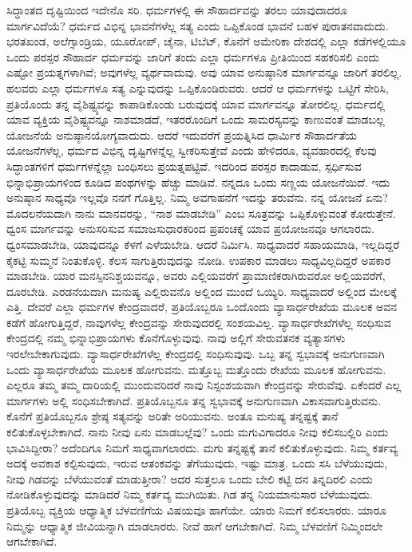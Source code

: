 ಸಿದ್ಧಾಂತದ ದೃಷ್ಟಿಯಿಂದ ಇದೇನೊ ಸರಿ. ಧರ್ಮಗಳಲ್ಲಿ ಈ ಸೌಹಾರ್ದವನ್ನು ತರಲು ಯಾವುದಾದರೂ ಮಾರ್ಗವಿದೆಯೆ? ಧರ್ಮದ ವಿಭಿನ್ನ ಭಾವನೆಗಳೆಲ್ಲ ಸತ್ಯ ಎಂದು ಒಪ್ಪಿಕೊಂಡ ಭಾವನೆ ಬಹಳ ಪುರಾತನವಾದುದು. ಭರತಖಂಡ, ಅಲೆಗ್ಸಾಂಡ್ರಿಯ, ಯೂರೋಪ್​, ಚೈನಾ, ಟಿಬೆಟ್​, ಕೊನೆಗೆ ಅಮೇರಿಕಾ ದೇಶದಲ್ಲಿ ಎಲ್ಲಾ ಕಡೆಗಳಲ್ಲಿಯೂ ಒಂದು ಪರಸ್ಪರ ಸೌಹಾರ್ದ ಧರ್ಮವನ್ನು ಜಾರಿಗೆ ತಂದು ಎಲ್ಲಾ ಧರ್ಮಗಳೂ ಪ್ರೀತಿಯಿಂದ ಸಹಕರಿಸಲಿ ಎಂದು ಎಷ್ಟೋ ಪ್ರಯತ್ನಗಳಾಗಿವೆ; ಅವುಗಳೆಲ್ಲ ವ್ಯರ್ಥವಾದುವು. ಅವು ಯಾವ ಅನುಷ್ಠಾನಿಕ ಮಾರ್ಗವನ್ನೂ ಜಾರಿಗೆ ತರಲಿಲ್ಲ. ಹಲವರು ಎಲ್ಲಾ ಧರ್ಮಗಳೂ ಸತ್ಯ ಎನ್ನುವುದನ್ನು ಒಪ್ಪಿಕೊಂಡಿರುವರು. ಆದರೆ ಆ ಧರ್ಮಗಳನ್ನು ಒಟ್ಟಿಗೆ ಸೇರಿಸಿ, ಪ್ರತಿಯೊಂದು ತನ್ನ ವೈಶಿಷ್ಟ್ಯವನ್ನು ಕಾಪಾಡಿಕೊಂಡು ಬರುವುದಕ್ಕೆ ಯಾವ ಮಾರ್ಗವನ್ನೂ ತೋರಲಿಲ್ಲ. ಧರ್ಮದಲ್ಲಿ ಯಾವ ವ್ಯಕ್ತಿಯ ವೈಶಿಷ್ಟ್ಯವನ್ನೂ ನಾಶಮಾಡದೆ, ಇತರರೊಂದಿಗೆ ಒಂದು ಸಾಮರಸ್ಯವನ್ನು ಕಾಣುವಂತೆ ಮಾಡಬಲ್ಲ ಯೋಜನೆಯೆ ಅನುಷ್ಠಾನಯೋಗ್ಯವಾದುದು. ಆದರೆ ಇದುವರೆಗೆ ಪ್ರಯತ್ನಿಸಿದ ಧಾರ್ಮಿಕ ಸೌಹಾರ್ದತೆಯ ಯೋಜನೆಗಳೆಲ್ಲ, ಧರ್ಮದ ವಿಭಿನ್ನ ದೃಷ್ಟಿಗಳನ್ನೆಲ್ಲ ಸ್ವೀಕರಿಸುತ್ತೇವೆ ಎಂದು ಹೇಳಿದರೂ, ವ್ಯವಹಾರದಲ್ಲಿ ಕೆಲವು ಸಿದ್ಧಾಂತಗಳಿಗೆ ಧರ್ಮಗಳನ್ನೆಲ್ಲಾ ಬಂಧಿಸಲು ಪ್ರಯತ್ನಪಟ್ಟಿವೆ. ಇದರಿಂದ ಪರಸ್ಪರ ಕಾದಾಡುವ, ಸ್ಪರ್ಧಿಸುವ ಭಿನ್ನಾಭಿಪ್ರಾಯಗಳಿಂದ ಕೂಡಿದ ಪಂಥಗಳನ್ನು ಹೆಚ್ಚು ಮಾಡಿವೆ. ನನ್ನದೂ ಒಂದು ಸಣ್ಣಯ ಯೋಜನೆಯಿದೆ. ಇದು ಅನುಷ್ಠಾನ ಸಾಧ್ಯವೊ ಇಲ್ಲವೊ ನನಗೆ ಗೊತ್ತಿಲ್ಲ. ನಿಮ್ಮ ಅವಗಾಹನೆಗೆ ಇದನ್ನು ತರುವೆನು. ನನ್ನ ಯೋಜನೆ ಏನು? ಮೊದಲನೆಯದಾಗಿ ನಾನು ಮಾನವರನ್ನು, “ನಾಶ ಮಾಡಬೇಡಿ” ಎಂಬ ಸೂತ್ರವನ್ನು ಒಪ್ಪಿಕೊಳ್ಳುವಂತೆ ಕೋರುತ್ತೇನೆ. ಧ್ವಂಸ ಮಾರ್ಗವನ್ನು ಅನುಸರಿಸುವ ಸಮಾಜಸುಧಾರಕರಿಂದ ಪ್ರಪಂಚಕ್ಕೆ ಯಾವ ಪ್ರಯೋಜನವೂ ಆಗಲಾರದು. ಧ್ವಂಸಮಾಡಬೇಡಿ, ಯಾವುದನ್ನೂ ಕೆಳಗೆ ಎಳೆಯಬೇಡಿ. ಆದರೆ ನಿರ್ಮಿಸಿ. ಸಾಧ್ಯವಾದರೆ ಸಹಾಯಮಾಡಿ, ಇಲ್ಲದಿದ್ದರೆ ಕೈಕಟ್ಟಿ ಸುಮ್ಮನೆ ನಿಂತುಕೊಳ್ಳಿ. ಕೆಲಸ ಸಾಗುತ್ತಿರುವುದನ್ನು ನೋಡಿ. ಉಪಕಾರ ಮಾಡಲು ಸಾಧ್ಯವಿಲ್ಲದಿದ್ದರೆ ಅಪಕಾರ ಮಾಡಬೇಡಿ. ಯಾರ ಮನಸ್ಸಿನ\break ನಿಶ್ಚಯವನ್ನೂ, ಅವರು ಎಲ್ಲಿಯವರೆಗೆ ಪ್ರಾಮಾಣಿಕರಾಗಿರುವರೋ ಅಲ್ಲಿಯವರೆಗೆ, ದೂರಬೇಡಿ. ಎರಡನೆಯದಾಗಿ ಮನುಷ್ಯ ಎಲ್ಲಿರುವನೊ ಅಲ್ಲಿಂದ ಮುಂದೆ ಒಯ್ಯಿರಿ. ಸಾಧ್ಯವಾದರೆ ಅಲ್ಲಿಂದ ಮೇಲಕ್ಕೆ ಎತ್ತಿ. ದೇವರೆ ಎಲ್ಲಾ ಧರ್ಮಗಳ ಕೇಂದ್ರವಾದರೆ, ಪ್ರತಿಯೊಬ್ಬರೂ ಒಂದೊಂದು ವ್ಯಾಸಾರ್ಧರೇಖೆಯ ಮೂಲಕ ಅವನ ಕಡೆಗೆ ಹೋಗುತ್ತಿದ್ದರೆ, ನಾವುಗಳೆಲ್ಲ ಕೇಂದ್ರವನ್ನು ಸೇರುವುದರಲ್ಲಿ ಸಂಶಯವಿಲ್ಲ. ವ್ಯಾಸಾರ್ಧರೇಖೆಗಳೆಲ್ಲ ಸಂಧಿಸುವ ಕೇಂದ್ರದಲ್ಲಿ ನಮ್ಮ ಭಿನ್ನಾಭಿಪ್ರಾಯಗಳು ಕೊನೆಗೊಳ್ಳುವುವು. ನಾವು ಅಲ್ಲಿಗೆ ಸೇರುವತನಕ ವ್ಯತ್ಯಾಸಗಳು ಇರಲೇಬೇಕಾಗುವುದು. ವ್ಯಾಸಾರ್ಧರೇಖೆಗಳೆಲ್ಲ ಕೇಂದ್ರದಲ್ಲಿ ಸಂಧಿಸುವುವು. ಒಬ್ಬ ತನ್ನ ಸ್ವಭಾವಕ್ಕೆ ಅನುಗುಣವಾಗಿ ಒಂದು ವ್ಯಾಸಾರ್ಧರೇಖೆಯ ಮೂಲಕ ಹೋಗುವನು. ಮತ್ತೊಬ್ಬ ಮತ್ತೊಂದು ರೇಖೆಯ ಮೂಲಕ ಹೋಗುವನು. ಎಲ್ಲರೂ ತಮ್ಮ ತಮ್ಮ ದಾರಿಯಲ್ಲಿ ಮುಂದುವರಿದರೆ ನಾವು ನಿಸ್ಸಂಶಯವಾಗಿ ಕೇಂದ್ರವನ್ನು ಸೇರುವೆವು. ಏಕೆಂದರೆ ಎಲ್ಲ ಮಾರ್ಗಗಳು ಅಲ್ಲಿ ಸಂಧಿಸಬೇಕಾಗಿದೆ. ಪ್ರತಿಯೊಬ್ಬನೂ ತನ್ನ ಸ್ವಭಾವಕ್ಕೆ ಅನುಗುಣವಾಗಿ ವಿಕಾಸವಾಗುತ್ತಿರುವನು. ಕೊನೆಗೆ ಪ್ರತಿಯೊಬ್ಬನೂ ಶ್ರೇಷ್ಠ ಸತ್ಯವನ್ನು ಅರಿತೇ ಅರಿಯುವನು. ಅಂತೂ ಮನುಷ್ಯ ತನ್ನಷ್ಟಕ್ಕೆ ತಾನೆ ಕಲಿತುಕೊಳ್ಳಬೇಕಾಗಿದೆ. ನಾನು ನೀವು ಏನು ಮಾಡಬಲ್ಲೆವು? ಒಂದು ಮಗುವಿಗಾದರೂ ನೀವು ಕಲಿಸಬಲ್ಲಿರಿ ಎಂದು ಭಾವಿಸಿದ್ದೀರಾ? ಅದೆಂದಿಗೂ ನಿಮಗೆ ಸಾಧ್ಯವಾಗಲಾರದು. ಮಗು ತನ್ನಷ್ಟಕ್ಕೆ ತಾನೆ ಕಲಿತುಕೊಳ್ಳುವುದು. ನಿಮ್ಮ ಕರ್ತವ್ಯ ಅದಕ್ಕೆ ಅವಕಾಶ ಕಲ್ಪಿಸುವುದು, ಇರುವ ಆತಂಕವನ್ನು ತೆಗೆಯುವುದು, ಇಷ್ಟು ಮಾತ್ರ. ಒಂದು ಸಸಿ ಬೆಳೆಯುವುದು, ನೀವು ಗಿಡವನ್ನು ಬೆಳೆಯುವಂತೆ ಮಾಡುತ್ತೀರಾ? ಅದರ ಸುತ್ತಲೂ ಒಂದು ಬೇಲಿ ಕಟ್ಟಿ ದನ ತಿನ್ನದಿರಲಿ ಎಂದು ನೋಡಿಕೊಳ್ಳುವುದನ್ನು ಮಾಡಿದರೆ ನಿಮ್ಮ ಕರ್ತವ್ಯ ಮುಗಿಯಿತು. ಗಿಡ ತನ್ನ ನಿಯಮಾನುಸಾರ ಬೆಳೆಯುವುದು. ಪ್ರತಿಯೊಬ್ಬ ವ್ಯಕ್ತಿಯ ಆಧ್ಯಾತ್ಮಿಕ ಬೆಳವಣಿಗೆಯ ವಿಷಯವೂ ಹಾಗೆಯೇ. ಯಾರು ನಿಮಗೆ ಕಲಿಸಲಾರರು. ಯಾರೂ ನಿಮ್ಮನ್ನು ಆಧ್ಯಾತ್ಮಿಕ ಜೀವಿಯನ್ನಾಗಿ ಮಾಡಲಾರರು. ನೀವೆ ಹಾಗೆ ಆಗಬೇಕಾಗಿದೆ. ನಿಮ್ಮ ಬೆಳವಣಿಗೆ ನಿಮ್ಮಿಂದಲೇ ಆಗಬೇಕಾಗಿದೆ.

